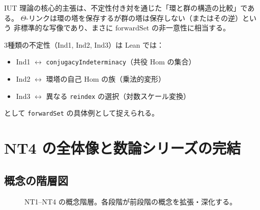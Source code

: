 \documentclass[a4paper,11pt]{ltjsarticle}
\theoremstyle{definition}
\theoremstyle{plain}
\theoremstyle{remark}
\begin{document}
\begin{mathinsight}
IUT 理論の核心的主張は、不定性付き対を通じた「環と群の構造の比較」である。
$\Theta$-リンクは環の塔を保存するが群の塔は保存しない（またはその逆）という
非標準的な写像であり、まさに $\mathrm{forwardSet}$ の非一意性に相当する。

3種類の不定性（Ind1, Ind2, Ind3）は Lean では：
\begin{itemize}
  \item Ind1 $\leftrightarrow$ \texttt{conjugacyIndeterminacy}（共役 Hom の集合）
  \item Ind2 $\leftrightarrow$ 環塔の自己 Hom の族（乗法的変形）
  \item Ind3 $\leftrightarrow$ 異なる \texttt{reindex} の選択（対数スケール変換）
\end{itemize}
として \texttt{forwardSet} の具体例として捉えられる。
\end{mathinsight}

\section{NT4 の全体像と数論シリーズの完結}
\label{sec:summary}

\subsection{概念の階層図}

\begin{figure}[H]
\centering
{}
\caption{NT1--NT4 の概念階層。各段階が前段階の概念を拡張・深化する。}
\label{fig:hierarchy}
\end{figure}
\end{document}
